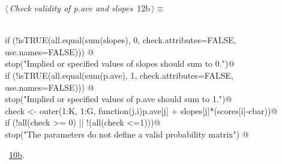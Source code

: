 \documentclass[reqno]{amsart}
\renewcommand{\NWtarget}[2]{\hypertarget{#1}{#2}}
\renewcommand{\NWlink}[2]{\hyperlink{#1}{#2}}
\begin{document}
\begin{flushleft} \small\label{scrap19}\raggedright\small
\NWtarget{nuweb12b}{} $\langle\,${\itshape Check validity of p.ave and slopes}\nobreak\ {\footnotesize {12b}}$\,\rangle\equiv$
\vspace{-1ex}
\begin{list}{}{} \item
\mbox{}\verb@@\\
\mbox{}\verb@  if (!isTRUE(all.equal(sum(slopes), 0, check.attributes=FALSE, use.names=FALSE))) @\\
\mbox{}\verb@      stop("Implied or specified values of slopes should sum to 0.")@\\
\mbox{}\verb@  if (!isTRUE(all.equal(sum(p.ave), 1, check.attributes=FALSE, use.names=FALSE))) @\\
\mbox{}\verb@      stop("Implied or specified values of p.ave should sum to 1.")@\\
\mbox{}\verb@  check <- outer(1:K, 1:G, function(j,i)p.ave[j] + slopes[j]*(scores[i]-cbar))@\\
\mbox{}\verb@  if (!all(check >= 0) || !(all(check <=1)))@\\
\mbox{}\verb@    stop("The parameters do not define a valid probability matrix")  @\\
\mbox{}\verb@@{\NWsep}
\end{list}
\vspace{-1.5ex}
\footnotesize
\begin{list}{}{\setlength{\itemsep}{-\parsep}\setlength{\itemindent}{-\leftmargin}}
\item \NWtxtMacroRefIn\ \NWlink{nuweb10b}{10b}.

\item{}
\end{list}
\vspace{4ex}
\end{flushleft}
\end{document}
